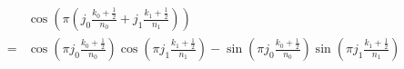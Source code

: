 \documentclass[a4paper, 12pt]{article}
\begin{document}
\begin{align*}
 ~& \cos \left( \pi \left( j_0 \frac{k_0 + \frac{1}{2}}{n_0} + j_1 \frac{k_1 + \frac{1}{2}}{n_1} \right)  \right) \\
 =&   \cos \left( \pi j_0 \frac{k_0 + \frac{1}{2}}{n_0} \right) \cos \left( \pi j_1 \frac{k_1 + \frac{1}{2}}{n_1} \right)
    - \sin \left( \pi j_0 \frac{k_0 + \frac{1}{2}}{n_0} \right) \sin \left( \pi j_1 \frac{k_1 + \frac{1}{2}}{n_1} \right)
\end{align*}
\end{document}
